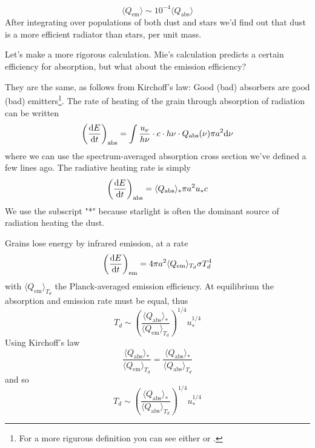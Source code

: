\begin{equation*}
    \langle Q_{\text{em}} \rangle \sim 10^{-4}\langle Q_{\text{abs}} \rangle
\end{equation*}
After integrating over populations of both dust and stars we'd find out that dust is a more efficient radiator than stars, per unit mass.
\par Let's make a more rigorous calculation. Mie's calculation predicts a certain efficiency for absorption, but what about the emission efficiency?
\par They are the same, as follows from Kirchoff's law: Good (bad) absorbers are good (bad) emitters\footnote{For a more rigurous definition you can see either \cite{choudhuri} or \cite{1986rpa..book.....R}.}. The rate of heating of the grain through absorption of radiation can be written
\begin{equation*}
    \left(\frac{\text{d}E}{\text{d}t}\right)_{\text{abs}} = \int \frac{u_{\nu}}{h\nu} \cdot c \cdot h\nu \cdot Q_{\text{abs}}(\nu)\pi a^{2} \text{d}\nu
\end{equation*}
where we can use the spectrum-averaged absorption cross section we've defined a few lines ago. The radiative heating rate is simply 
\begin{equation*}
    \left(\frac{\text{d}E}{\text{d}t}\right)_{\text{abs}} = \langle Q_{\text{abs}} \rangle_{*}\pi a^{2}u_{*}c
\end{equation*}
We use the subscript "*" because starlight is often the dominant source of radiation heating the dust.
\par Grains lose energy by infrared emission, at a rate
\begin{equation*}
    \left(\frac{\text{d}E}{\text{d}t}\right)_{\text{em}} = 4\pi a^{2}\langle Q_{\text{em}} \rangle_{T_{d}}\sigma T_{d}^{4}
\end{equation*}
with $\langle Q_{\text{em}} \rangle_{T_{d}}$ the Planck-averaged emission efficiency. At equilibrium the absorption and emission rate must be equal, thus 
\begin{equation*}
    T_{d}\sim \left(\frac{\langle Q_{\text{abs}} \rangle_{*}}{\langle Q_{\text{em}} \rangle_{T_{d}}}\right)^{1/4}u_{*}^{1/4}
\end{equation*}
Using Kirchoff's law
\begin{equation*}
    \frac{\langle Q_{\text{abs}} \rangle_{*}}{\langle Q_{\text{em}} \rangle_{T_{d}}} = \frac{\langle Q_{\text{abs}} \rangle_{*}}{\langle Q_{\text{abs}} \rangle_{T_{d}}}
\end{equation*}
and so
\begin{equation*}
    T_{d}\sim \left(\frac{\langle Q_{\text{abs}} \rangle_{*}}{\langle Q_{\text{abs}} \rangle_{T_{d}}}\right)^{1/4}u_{*}^{1/4}
\end{equation*}
